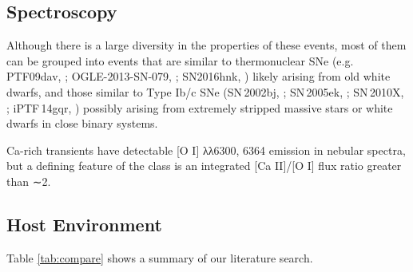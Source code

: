 \documentclass[twocolumn]{aastex63}
\begin{document}
\begin{CJK*}{UTF8}{gbsn}
\subsection{Spectroscopy}

Although there is a large diversity in the properties of these events, most of them can be 
grouped into events that are similar to thermonuclear SNe (e.g. PTF09dav, \citealt{Sullivan2011}; 
OGLE-2013-SN-079, \citealt{Inserra2015}; SN2016hnk, \citealt{Galbany2019, Jacobson-Galan2019}) 
likely arising from old white dwarfs, and those similar to Type Ib/c SNe (SN\,2002bj, 
\citealt{Poznanski2010}; SN\,2005ek, \citealt{Drout2013}; SN\,2010X, \citealt{Kasliwal2010}; iPTF\,14gqr, 
\citealt{De2018}) possibly arising from extremely stripped massive stars or white dwarfs in close binary 
systems.

Ca-rich transients have detectable [O I] λλ6300, 6364 emission in nebular spectra, but a defining 
feature of the class is an integrated [Ca II]/[O I] flux ratio greater than ∼2. 

\subsection{Host Environment}

Table \ref{tab:compare} shows a summary of our literature search.


\end{CJK*}
\end{document}
